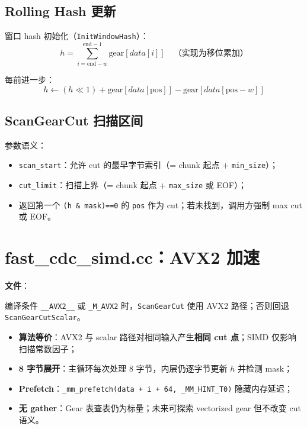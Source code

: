\subsection{Rolling Hash 更新}

窗口 hash 初始化（\texttt{InitWindowHash}）：
\[
h = \sum_{i=\text{end}-w}^{\text{end}-1} \text{gear}[data[i]] \quad \text{（实现为移位累加）}
\]

每前进一步：
\[
h \leftarrow (h \ll 1) + \text{gear}[data[\text{pos}]] - \text{gear}[data[\text{pos}-w]]
\]

\subsection{ScanGearCut 扫描区间}

参数语义：
\begin{itemize}[nosep]
  \item \texttt{scan\_start}：允许 cut 的最早字节索引（= chunk 起点 + \texttt{min\_size}）；
  \item \texttt{cut\_limit}：扫描上界（= chunk 起点 + \texttt{max\_size} 或 EOF）；
  \item 返回第一个 \texttt{(h \& mask)==0} 的 \texttt{pos} 作为 cut；若未找到，调用方强制 max cut 或 EOF。
\end{itemize}

\section{fast\_cdc\_simd.cc：AVX2 加速}
\label{sec:fastcdc-simd}

\textbf{文件}：

编译条件 \texttt{\_\_AVX2\_\_} 或 \texttt{\_M\_AVX2} 时，\texttt{ScanGearCut} 使用 AVX2 路径；否则回退 \texttt{ScanGearCutScalar}。

\begin{designbox}[SIMD 策略（v0.9.x）]
\begin{itemize}[nosep]
  \item \textbf{算法等价}：AVX2 与 scalar 路径对相同输入产生\textbf{相同 cut 点}；SIMD 仅影响扫描常数因子；
  \item \textbf{8 字节展开}：主循环每次处理 8 字节，内层仍逐字节更新 $h$ 并检测 mask；
  \item \textbf{Prefetch}：\texttt{\_mm\_prefetch(data + i + 64, \_MM\_HINT\_T0)} 隐藏内存延迟；
  \item \textbf{无 gather}：Gear 表查表仍为标量；未来可探索 vectorized gear 但不改变 cut 语义。
\end{itemize}
\end{designbox}

